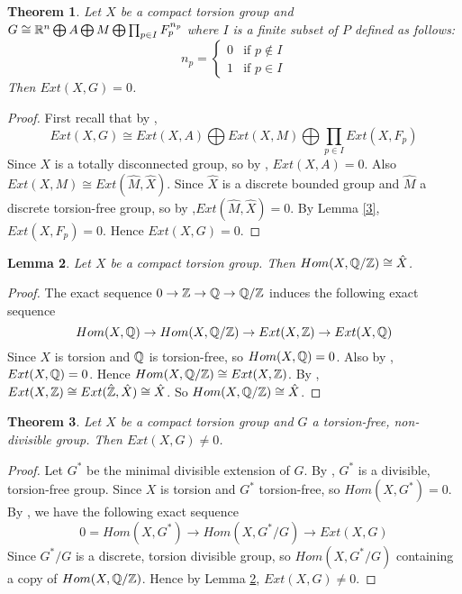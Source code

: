 \documentclass{amsart}
\newtheorem{thm}{Theorem}[section]
\newtheorem{lem}[thm]{Lemma}
\theoremstyle{definition}
\theoremstyle{remark}
\numberwithin{equation}{section}
\begin{document}
\begin{thm}\label{7}
Let $X$ be a compact torsion group and $G\cong \Bbb R^{n}\bigoplus A\bigoplus M\bigoplus \prod_{p\in I} F_{p}^{n_{p}}$ where $I$ is a finite subset of $P$ defined as follows:
 $$n_{p}=
\left\{
	\begin{array}{ll}
		0  & \mbox{if } p\not\in I \\
		1 & \mbox{if } p\in I
	\end{array}
\right.$$
Then $Ext(X,G)=0$.
\end{thm}
\begin{proof}
First recall that by \cite[Theorem 2.13]{FG1}, $$Ext(X,G)\cong Ext(X,A)\bigoplus Ext(X,M)\bigoplus \prod_{p\in I}Ext(X,F_{p})$$ Since $X$ is a totally disconnected group, so by \cite[Theorem 3.4]{FG1}, $Ext(X,A)=0$. Also $Ext(X,M)\cong Ext(\hat{M},\hat{X})$. Since $\hat{X}$ is a discrete bounded group and $\hat{M}$ a discrete torsion-free group, so by \cite[Theorem 27.5]{F},$Ext(\hat{M},\hat{X})=0$. By Lemma \ref{3}, $Ext(X,F_{p})=0$. Hence $Ext(X,G)=0$.
\end{proof}
\begin{lem}\label{8}
Let $X$ be a compact torsion group. Then $Hom(X,\Bbb Q/\Bbb Z)\cong \hat{X}$.\\
\end{lem}
\begin{proof}
The exact sequence $0\to \Bbb Z\to \Bbb Q\to \Bbb Q/\Bbb Z$ induces the following exact sequence $$Hom(X,\Bbb Q)\to Hom(X,\Bbb Q/\Bbb Z)\to Ext(X,\Bbb Z)\to Ext(X,\Bbb Q)$$ Since $X$ is torsion and $\Bbb Q$ is torsion-free, so $Hom(X,\Bbb Q)=0$. Also by \cite[Theorem 3.4]{FG1}, $Ext(X,\Bbb Q)=0$. Hence $Hom(X,\Bbb Q/\Bbb Z)\cong Ext(X,\Bbb Z)$. By \cite[Theorem 2.12 and Proposition 2.17]{FG1}, $Ext(X,\Bbb Z)\cong Ext(\hat{\Bbb Z},\hat{X})\cong \hat{X}$. So $Hom(X,\Bbb Q/\Bbb Z)\cong \hat{X}$.
\end{proof}
\begin{thm}\label{9}
Let $X$ be a compact torsion group and $G$ a torsion-free, non-divisible group. Then $Ext(X,G)\neq 0$.
\end{thm}
\begin{proof}
Let $G^{\ast}$ be the minimal divisible extension of $G$. By \cite[A.13]{HR}, $G^{\ast}$ is a divisible, torsion-free group. Since $X$ is torsion and $G^{\ast}$ torsion-free, so $Hom(X,G^{\ast})=0$. By \cite[Corollary 2.10]{FG1}, we have the following exact sequence $$0=Hom(X,G^{\ast})\to Hom(X,G^{\ast}/G)\to Ext(X,G)$$ Since $G^{\ast}/G$ is a discrete, torsion divisible group, so $Hom(X,G^{\ast}/G)$ containing a copy of $Hom(X,\Bbb Q/\Bbb Z)$. Hence by Lemma \ref{8}, $Ext(X,G)\neq 0$.
\end{proof}
\end{document}
